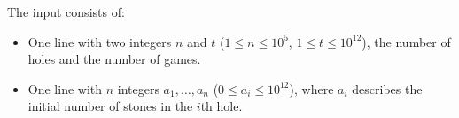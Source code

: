 
The input consists of:
\begin{itemize}
  \item One line with two integers $n$ and $t$ ($1 \leq n \leq 10^5$, $1 \leq t \leq 10^{12}$),
  the number of holes and the number of games.
  \item One line with $n$ integers $a_1, \ldots, a_n$ ($0 \leq a_i \leq 10^{12}$),
  where $a_i$ describes the initial number of stones in the $i$th hole.
\end{itemize}
